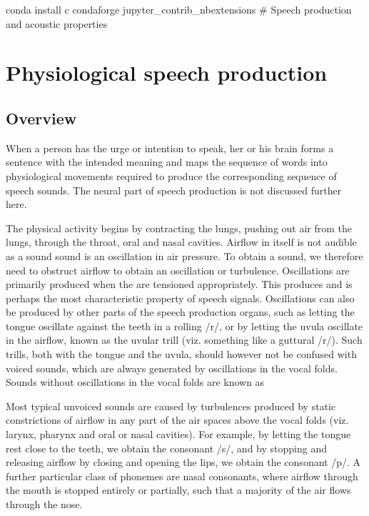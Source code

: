 \documentclass[letterpaper,10pt,english]{jupyterBook}
\begin{document}
\sphinxAtStartPar
conda install \sphinxhyphen{}c conda\sphinxhyphen{}forge jupyter\_contrib\_nbextensions \# Speech production and acoustic properties


\section{Physiological speech production}
\label{\detokenize{Introduction/Speech_production_and_acoustic_properties:physiological-speech-production}}\label{\detokenize{Introduction/Speech_production_and_acoustic_properties::doc}}

\subsection{Overview}
\label{\detokenize{Introduction/Speech_production_and_acoustic_properties:overview}}
\sphinxAtStartPar
When a person has the urge or intention to speak, her or his brain forms
a sentence with the intended meaning and maps the sequence of words into
physiological movements required to produce the corresponding sequence
of speech sounds. The neural part of speech production is not discussed
further here.

\sphinxAtStartPar
The physical activity begins by contracting the lungs, pushing out air
from the lungs, through the throat, oral and nasal cavities. Airflow in
itself is not audible as a sound \sphinxhyphen{} sound is an oscillation in air
pressure. To obtain a sound, we therefore need to obstruct airflow to
obtain an oscillation or turbulence. Oscillations are primarily produced
when the  are
tensioned appropriately. This produces  and is perhaps
the most characteristic property of speech signals. Oscillations can
also be produced by other parts of the speech production organs, such as
letting the tongue oscillate against the teeth in a rolling /r/, or by
letting the uvula oscillate in the airflow, known as the uvular trill
(viz. something like a guttural /r/). Such trills, both with the tongue
and the uvula, should however not be confused with voiced sounds, which
are always generated by oscillations in the vocal folds. Sounds without
oscillations in the vocal folds are known as 

\sphinxAtStartPar
Most typical unvoiced sounds are caused by turbulences produced by
static constrictions of airflow in any part of the air spaces above the
vocal folds (viz. larynx, pharynx and oral or nasal cavities). For
example, by letting the tongue rest close to the teeth, we obtain the
consonant /s/, and by stopping and releasing airflow by closing and
opening the lips, we obtain the consonant /p/. A further particular
class of phonemes are nasal consonants, where airflow through the mouth
is stopped entirely or partially, such that a majority of the air flows
through the nose.
\end{document}
